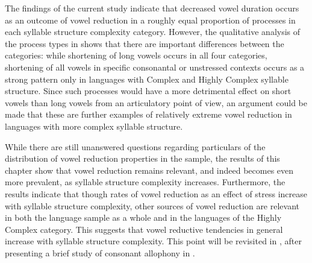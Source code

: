   The findings of the current study indicate that decreased vowel duration occurs as an outcome of vowel reduction in a roughly equal proportion of processes in each syllable structure complexity category. However, the qualitative analysis of the process types in  shows that there are important differences between the categories: while shortening of long vowels occurs in all four categories, shortening of all vowels in specific consonantal or unstressed contexts occurs as a strong pattern only in languages with Complex and Highly Complex syllable structure. Since such processes would have a more detrimental effect on short vowels than long vowels from an articulatory point of view, an argument could be made that these are further examples of relatively extreme vowel reduction in languages with more complex syllable structure.

  While there are still unanswered questions regarding particulars of the distribution of vowel reduction properties in the sample, the results of this chapter show that vowel reduction remains relevant, and indeed becomes even more prevalent, as syllable structure complexity increases. Furthermore, the results indicate that though rates of vowel reduction as an effect of stress increase with syllable structure complexity, other sources of vowel reduction are relevant in both the language sample as a whole and in the languages of the Highly Complex category. This suggests that vowel reductive tendencies in general increase with syllable structure complexity. This point will be revisited in , after presenting a brief study of consonant allophony in .

